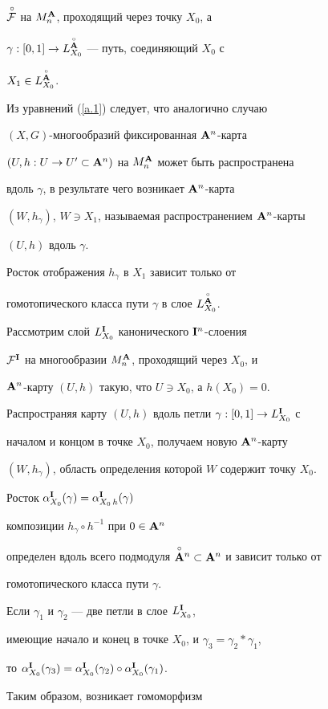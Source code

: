 $\overset{\,\circ}{\cal F}{}$ на $M^{\bold A}_n$, проходящий через точку $X_0$, а


$\gamma:[0,1]\to L^{\overset{\circ}{\bold A}{}}_{X_0}$ --- путь, соединяющий $X_0$ с


$X_1\in L^{\overset{\circ}{\bold A}{}}_{X_0}$.


Из уравнений (\ref{a.1}) следует, что аналогично случаю


$(X,G)$-многообразий фиксированная ${\bold A}^n$-карта


$(U,h:U\to U'\subset{\bold A}^n)$ на $M^{\bold A}_n$ может быть распространена


вдоль $\gamma$, в результате чего возникает ${\bold A}^n$-карта


$(W,h_\gamma)$, $W\ni X_1$, называемая распространением ${\bold A}^n$-карты


$(U,h)$ вдоль $\gamma$.


Росток отображения $h_\gamma$ в $X_1$ зависит только от


гомотопического класса пути $\gamma$ в слое $L^{\overset{\circ}{\bold A}{}}_{X_0}$.


 


Рассмотрим слой $L^{\bold I}_{X_0}$ канонического ${\bold I}^n$-слоения


${\cal F}^{\bold I}$ на многообразии $M^{\bold A}_n$, проходящий через $X_0$, и


${\bold A}^n$-карту $(U,h)$ такую, что $U\ni X_0$, а $h(X_0)=0$.


Распространяя карту $(U,h)$ вдоль петли $\gamma:[0,1]\to L^{\bold I}_{X_0}$ с


началом и концом в точке $X_0$, получаем новую ${\bold A}^n$-карту


$(W,h_\gamma)$, область определения которой $W$ содержит точку $X_0$.


Росток $\alpha^{\bold I}_{X_0}(\gamma)=\alpha^{\bold I}_{X_0\, h}(\gamma)$


композиции $h_\gamma\circ h^{-1}$ при $0\in{\bold A}^n$


определен вдоль всего подмодуля $\overset{\circ}{{\bold A}}{}^n\subset{\bold A}^n$ и зависит только от


гомотопического класса пути $\gamma$.


Если $\gamma_1$ и $\gamma_2$ --- две петли в слое $L^{\bold I}_{X_0}$,


имеющие начало и конец в точке $X_0$, и $\gamma_3=\gamma_2*\gamma_1$,


то $\alpha^\I_{X_0}(\gamma_3)=\alpha^\I_{X_0}(\gamma_2)\circ


\alpha^\I_{X_0}(\gamma_1)$.


Таким образом, возникает гомоморфизм


